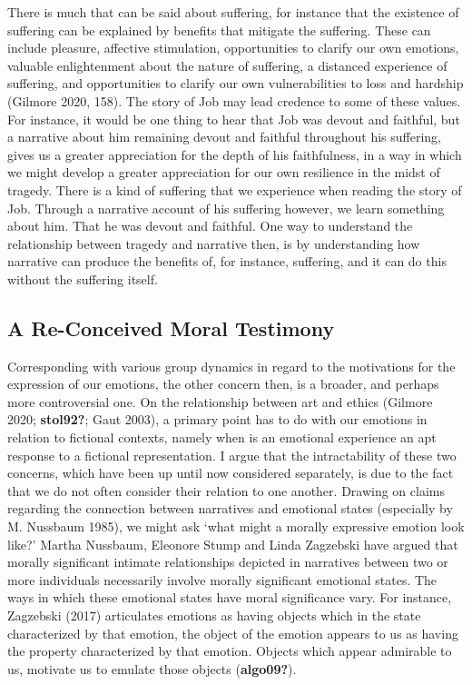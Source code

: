 \documentclass[12pt]{book}
\theoremstyle{definition}
\theoremstyle{remark}
\begin{document}
There is much that can be said about suffering, for instance that the existence of suffering can be explained by benefits that mitigate the suffering. These can include pleasure, affective stimulation, opportunities to clarify our own emotions, valuable enlightenment about the nature of suffering, a distanced experience of suffering, and opportunities to clarify our own vulnerabilities to loss and hardship (Gilmore 2020, 158). The story of Job may lead credence to some of these values. For instance, it would be one thing to hear that Job was devout and faithful, but a narrative about him remaining devout and faithful throughout his suffering, gives us a greater appreciation for the depth of his faithfulness, in a way in which we might develop a greater appreciation for our own resilience in the midst of tragedy. There is a kind of suffering that we experience when reading the story of Job. Through a narrative account of his suffering however, we learn something about him. That he was devout and faithful. One way to understand the relationship between tragedy and narrative then, is by understanding how narrative can produce the benefits of, for instance, suffering, and it can do this without the suffering itself.

\subsection*{A Re-Conceived Moral Testimony}\label{a-re-conceived-moral-testimony}

Corresponding with various group dynamics in regard to the motivations for the expression of our emotions, the other concern then, is a broader, and perhaps more controversial one. On the relationship between art and ethics (Gilmore 2020; \textbf{stol92?}; Gaut 2003), a primary point has to do with our emotions in relation to fictional contexts, namely when is an emotional experience an apt response to a fictional representation. I argue that the intractability of these two concerns, which have been up until now considered separately, is due to the fact that we do not often consider their relation to one another. Drawing on claims regarding the connection between narratives and emotional states (especially by M. Nussbaum 1985), we might ask `what might a morally expressive emotion look like?' Martha Nussbaum, Eleonore Stump and Linda Zagzebski have argued that morally significant intimate relationships depicted in narratives between two or more individuals necessarily involve morally significant emotional states. The ways in which these emotional states have moral significance vary. For instance, Zagzebski (2017) articulates emotions as having objects which in the state characterized by that emotion, the object of the emotion appears to us as having the property characterized by that emotion. Objects which appear admirable to us, motivate us to emulate those objects (\textbf{algo09?}).
\end{document}
